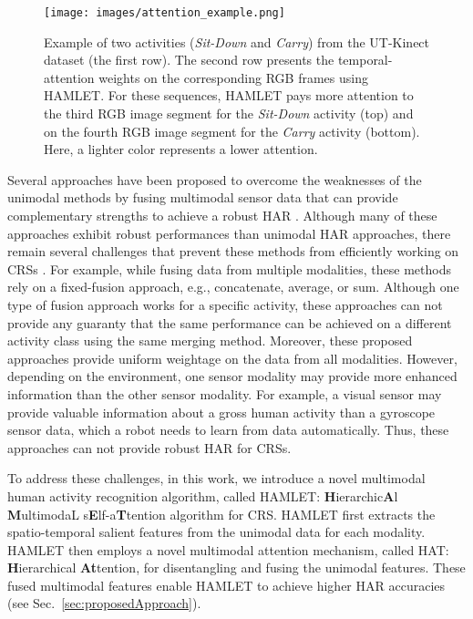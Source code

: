 \documentclass[runningheads]{llncs}
\newcommand{\pa}{HAMLET}
\newcommand{\fpa}{HAMLET: \textbf{H}ierarchic\textbf{A}l \textbf{M}ultimodaL s\textbf{E}lf-a\textbf{T}tention}
\newcommand{\fhattn}{HAT: \textbf{H}ierarchical \textbf{At}tention}
\begin{document}
\begin{figure}[!t]
    \centering
    \texttt{[image: images/attention\_example.png]}
    \caption{Example of two activities (\textit{Sit-Down} and \textit{Carry}) from the UT-Kinect dataset (the first row). The second row presents the temporal-attention weights on the corresponding RGB frames using {\pa }. For these sequences, {\pa } pays more attention to the third RGB image segment for the \textit{Sit-Down} activity (top) and on the fourth RGB image segment for the \textit{Carry} activity (bottom). Here, a lighter color represents a lower attention.}
    \label{fig:hat}
     \vspace{-0.3in}
\end{figure}

Several approaches have been proposed to overcome the weaknesses of the unimodal methods by fusing multimodal sensor data that can provide complementary strengths to achieve a robust HAR  \cite{multimodal_survey,mit_ucsd,self_attention_iros19,keyless,fusion_approaches,Hasan_2019}. 
Although many of these approaches exhibit robust performances than unimodal HAR approaches, there remain several challenges that prevent these methods from efficiently working on CRSs \cite{multimodal_survey}. 
For example, while fusing data from multiple modalities, these methods rely on a fixed-fusion approach, e.g., concatenate, average, or sum. Although one type of fusion approach works for a specific activity, these approaches can not provide any guaranty that the same performance can be achieved on a different activity class using the same merging method. Moreover, these proposed approaches provide uniform weightage on the data from all modalities. However, depending on the environment, one sensor modality may provide more enhanced information than the other sensor modality. For example, a visual sensor may provide valuable information about a gross human activity than a gyroscope sensor data, which a robot needs to learn from data automatically. Thus, these approaches can not provide robust HAR for CRSs.


To address these challenges, in this work, we introduce a novel multimodal human activity recognition algorithm, called {\fpa } algorithm for CRS. 
{\pa } first extracts the spatio-temporal salient features from the unimodal data for each modality. {\pa } then employs a novel multimodal attention mechanism, called \fhattn, for disentangling and fusing the unimodal features. These fused multimodal features enable {\pa } to achieve higher HAR accuracies (see Sec.~\ref{sec:proposedApproach}).
\end{document}
